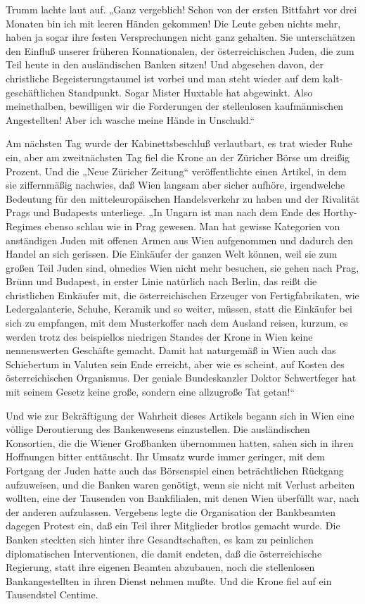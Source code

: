 Trumm lachte laut auf. „Ganz vergeblich! Schon von der ersten
Bittfahrt vor drei Monaten bin ich mit leeren Händen gekommen! Die
Leute geben nichts mehr, haben ja sogar ihre festen Versprechungen
nicht ganz gehalten. Sie unterschätzen den Einfluß unserer früheren
Konnationalen, der österreichischen Juden, die zum Teil heute in
den ausländischen Banken sitzen! Und abgesehen davon, der
christliche Begeisterungstaumel ist vorbei und man steht wieder auf
dem kalt-geschäftlichen Standpunkt. Sogar Mister Huxtable hat
abgewinkt. Also meinethalben, bewilligen wir die Forderungen der
stellenlosen kaufmännischen Angestellten! Aber ich wasche meine
Hände in Unschuld.“

Am nächsten Tag wurde der Kabinettsbeschluß
verlautbart, es trat wieder Ruhe ein, aber am zweitnächsten Tag
fiel die Krone an der Züricher Börse um dreißig Prozent. Und die
„Neue Züricher Zeitung“ veröffentlichte einen Artikel, in dem sie
ziffernmäßig nachwies, daß Wien langsam aber sicher aufhöre,
irgendwelche Bedeutung für den mitteleuropäischen Handelsverkehr zu
haben und der Rivalität Prags und Budapests unterliege. „In Ungarn
ist man nach dem Ende des Horthy-Regimes ebenso schlau wie in Prag
gewesen. Man hat gewisse Kategorien von anständigen Juden mit
offenen Armen aus Wien aufgenommen und dadurch den Handel an sich
gerissen. Die Einkäufer der ganzen Welt können, weil sie zum großen
Teil Juden sind, ohnedies Wien nicht mehr besuchen, sie gehen nach
Prag, Brünn und Budapest, in erster Linie natürlich nach Berlin,
das reißt die christlichen Einkäufer mit, die österreichischen
Erzeuger von Fertigfabrikaten, wie Ledergalanterie, Schuhe, Keramik
und so weiter, müssen, statt die Einkäufer bei sich zu empfangen,
mit dem Musterkoffer nach dem Ausland reisen, kurzum, es werden
trotz des beispiellos niedrigen Standes der Krone in Wien keine
nennenswerten Geschäfte gemacht. Damit hat naturgemäß in Wien auch
das Schiebertum in Valuten sein Ende erreicht, aber wie es scheint,
auf Kosten des österreichischen Organismus. Der geniale
Bundeskanzler Doktor Schwertfeger hat mit seinem Gesetz keine
große, sondern eine allzugroße Tat getan!“

Und wie zur Bekräftigung der Wahrheit dieses Artikels begann sich
in Wien eine völlige Deroutierung des  Bankenwesens
einzustellen. Die ausländischen Konsortien, die die Wiener
Großbanken übernommen hatten, sahen sich in ihren Hoffnungen bitter
enttäuscht. Ihr Umsatz wurde immer geringer, mit dem Fortgang der
Juden hatte auch das Börsenspiel einen beträchtlichen Rückgang
aufzuweisen, und die Banken waren genötigt, wenn sie nicht mit
Verlust arbeiten wollten, eine der Tausenden von Bankfilialen, mit
denen Wien überfüllt war, nach der anderen aufzulassen. Vergebens
legte die Organisation der Bankbeamten dagegen Protest ein, daß ein
Teil ihrer Mitglieder brotlos gemacht wurde. Die Banken steckten
sich hinter ihre Gesandtschaften, es kam zu peinlichen
diplomatischen Interventionen, die damit endeten, daß die
österreichische Regierung, statt ihre eigenen Beamten abzubauen,
noch die stellenlosen Bankangestellten in ihren Dienst nehmen
mußte. Und die Krone fiel auf ein Tausendstel Centime.

